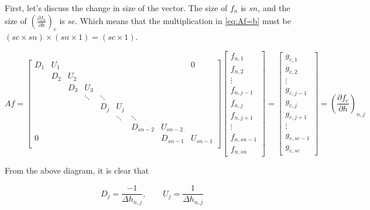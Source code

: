 \documentclass[11pt]{article}
\begin{document}
First, let's discuss the change in size of the vector. The size of $f_n$ is $sn$, and the size of $\left( \frac{\partial f_{n}}{\partial h} \right)_{c}$ is $sc$. Which means that the multiplication in \ref{eq:Af=b} must be $(sc \times sn) \times (sn \times 1) = (sc \times 1)$.

\[
Af = 
\left[
\begin{array}{ccccccccc}
D_{1} & U_{1} &  &   &   &   &   &   & 0 \\
  & D_{2} & U_{2} &   &   &   &   &   &   \\
  &   & D_{3} & U_{3} &   &   &   &   &   \\
  &   &  & \ddots & \ddots &   &   &   &   \\
  &   &   &   & D_{j} & U_{j} &   &   &   \\
  &   &   &   &  & \ddots & \ddots &   &   \\
  &   &   &   &   &   & D_{sn-2} & U_{sn-2} &   \\
 0 &   &   &   &   &   &   & D_{sn-1} & U_{sn-1} \\
\end{array}
\right]
\left[ \begin{array}{c}
f_{n,1} \\ f_{n,2} \\ \vdots \\ f_{n,j-1} \\ f_{n,j} \\ f_{n,j+1} \\ \vdots \\ f_{n,sn-1} \\ f_{n,sn}
\end{array} \right]
=
\left[ \begin{array}{c}
g_{c,1} \\ g_{c,2} \\ \vdots \\ g_{c,j-1} \\ g_{c,j} \\ g_{c,j+1} \\ \vdots \\ g_{c,sc-1} \\ g_{c,sc}
\end{array} \right]
 = \left( \frac{\partial f_{c}}{\partial h} \right)_{n,j}
\]

From the above diagram, it is clear that

\begin{equation}
  D_j = \frac{-1}{\Delta h_{n,j}}, \qquad
  U_j = \frac{1}{\Delta h_{n,j}}
\end{equation}
\end{document}
